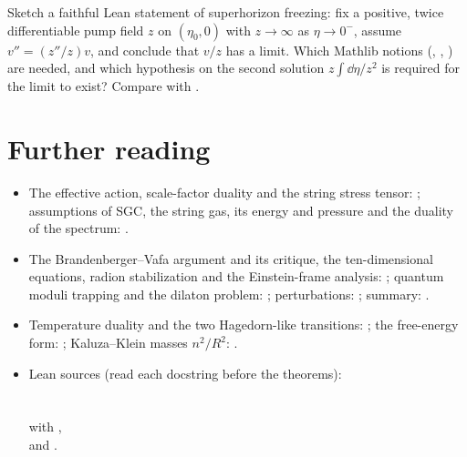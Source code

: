 \begin{exercise}[$\star\star\star$]
Sketch a faithful Lean statement of superhorizon freezing: fix a positive, twice
differentiable pump field $z$ on $(\eta_0,0)$ with $z\to\infty$ as $\eta\to0^-$, assume
$v''=(z''/z)v$, and conclude that $v/z$ has a limit. Which Mathlib notions (,
, ) are needed, and which hypothesis on the second
solution $z\int\dd\eta/z^2$ is required for the limit to exist? Compare with
.
\end{exercise}

\section*{Further reading}
\begin{itemize}[leftmargin=*,itemsep=1pt]
\item The effective action, scale-factor duality and the string stress tensor:
 ; assumptions of SGC, the string gas, its energy and pressure
 and the duality of the spectrum: .
\item The Brandenberger--Vafa argument and its critique, the ten-dimensional equations,
 radion stabilization and the Einstein-frame analysis: ;
 quantum moduli trapping and the dilaton problem: ;
 perturbations: ; summary: .
\item Temperature duality and the two Hagedorn-like transitions:
 ; the free-energy form: ;
 Kaluza--Klein masses $n^2/R^2$: .
\item Lean sources (read each docstring before the theorems):\\
 \\
 \\
  with ,\\
  and .
\end{itemize}
